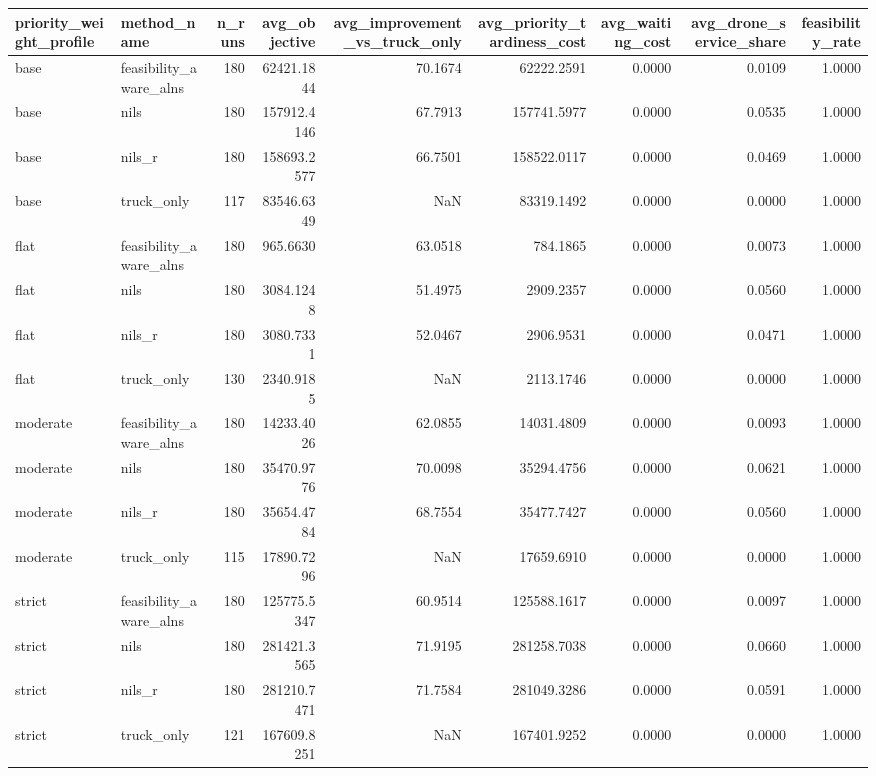 \begin{tabular}{llrrrrrrr}
\toprule
priority_weight_profile & method_name & n_runs & avg_objective & avg_improvement_vs_truck_only & avg_priority_tardiness_cost & avg_waiting_cost & avg_drone_service_share & feasibility_rate \\
\midrule
base & feasibility_aware_alns & 180 & 62421.1844 & 70.1674 & 62222.2591 & 0.0000 & 0.0109 & 1.0000 \\
base & nils & 180 & 157912.4146 & 67.7913 & 157741.5977 & 0.0000 & 0.0535 & 1.0000 \\
base & nils_r & 180 & 158693.2577 & 66.7501 & 158522.0117 & 0.0000 & 0.0469 & 1.0000 \\
base & truck_only & 117 & 83546.6349 & NaN & 83319.1492 & 0.0000 & 0.0000 & 1.0000 \\
flat & feasibility_aware_alns & 180 & 965.6630 & 63.0518 & 784.1865 & 0.0000 & 0.0073 & 1.0000 \\
flat & nils & 180 & 3084.1248 & 51.4975 & 2909.2357 & 0.0000 & 0.0560 & 1.0000 \\
flat & nils_r & 180 & 3080.7331 & 52.0467 & 2906.9531 & 0.0000 & 0.0471 & 1.0000 \\
flat & truck_only & 130 & 2340.9185 & NaN & 2113.1746 & 0.0000 & 0.0000 & 1.0000 \\
moderate & feasibility_aware_alns & 180 & 14233.4026 & 62.0855 & 14031.4809 & 0.0000 & 0.0093 & 1.0000 \\
moderate & nils & 180 & 35470.9776 & 70.0098 & 35294.4756 & 0.0000 & 0.0621 & 1.0000 \\
moderate & nils_r & 180 & 35654.4784 & 68.7554 & 35477.7427 & 0.0000 & 0.0560 & 1.0000 \\
moderate & truck_only & 115 & 17890.7296 & NaN & 17659.6910 & 0.0000 & 0.0000 & 1.0000 \\
strict & feasibility_aware_alns & 180 & 125775.5347 & 60.9514 & 125588.1617 & 0.0000 & 0.0097 & 1.0000 \\
strict & nils & 180 & 281421.3565 & 71.9195 & 281258.7038 & 0.0000 & 0.0660 & 1.0000 \\
strict & nils_r & 180 & 281210.7471 & 71.7584 & 281049.3286 & 0.0000 & 0.0591 & 1.0000 \\
strict & truck_only & 121 & 167609.8251 & NaN & 167401.9252 & 0.0000 & 0.0000 & 1.0000 \\
\bottomrule
\end{tabular}
